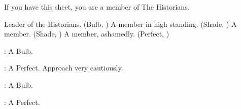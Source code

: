 \documentclass[blue]{Silversiders}
\begin{document}
\name{\bHistorians{}}

If you have this sheet, you are a member of The Historians.

\begin{members}
	\member{\cHonor{}} Leader of the Historians. (Bulb, \cHonor{\Sex})
	\member{\cLove{}} A member in high standing. (Shade, \cLove{\Sex})
	\member{\cWisdom{}} A member. (Shade, \cWisdom{\Sex})
	\member{\cPestilence{}} A member, ashamedly. (Perfect, \cPestilence{\Sex})
	
\end{members}

\begin{itemz}
	\item \cBeauty{}: A \cBeauty{\sex} Bulb.
	\item \cWar{}: A \cWar{\sex} Perfect. Approach very cautiously.
	\item \cOutcast{}: A \cOutcast{\sex} Bulb.
	\item \cFamine{}: A \cFamine{\sex} Perfect.

\end{itemz}
\end{document}
